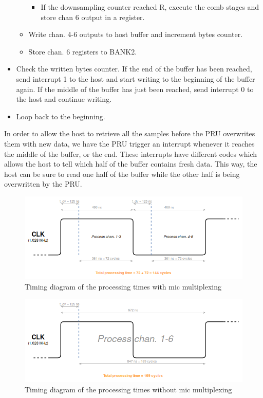 \documentclass[]{report}
\providecommand{\tightlist}{%
	\setlength{\itemsep}{0pt}\setlength{\parskip}{0pt}}
\begin{document}
\begin{itemize}
\begin{itemize}
    \begin{itemize}
    \tightlist
    \item
      If the downsampling counter reached R, execute the comb stages and
      store chan 6 output in a register.
    \end{itemize}
  \item
    Write chan. 4-6 outputs to host buffer and increment bytes counter.
  \item
    Store chan. 6 registers to BANK2.
  \end{itemize}
\item
  Check the written bytes counter. If the end of the buffer has been
  reached, send interrupt 1 to the host and start writing to the
  beginning of the buffer again. If the middle of the buffer has just
  been reached, send interrupt 0 to the host and continue writing.
\item
  Loop back to the beginning.
\end{itemize}

In order to allow the host to retrieve all the samples before the PRU overwrites them with new data, we have the PRU trigger an interrupt whenever it reaches the middle of the buffer, or the end. These interrupts have different codes which allows the host to tell which half of the buffer contains fresh data. This way, the host can be sure to read one half of the buffer while the other half is being overwritten by the PRU.

\begin{figure}[h]
\centering
\includegraphics[width=1.0\linewidth]{Pictures/PRU_timing_diagram_mic_multiplexing.png}
\caption{Timing diagram of the processing times with mic multiplexing}
\label{fig:multiplex-mics}
\end{figure}

\begin{figure}[h]
\centering
\includegraphics[width=1.0\linewidth]{Pictures/PRU_timing_diagram_no_mic_multiplexing.png}
\caption{Timing diagram of the processing times without mic
multiplexing}
\label{fig:nonmultiplex-mics}
\end{figure}
\end{document}
